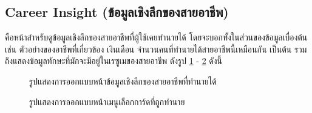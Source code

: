 \subsection{Career Insight (ข้อมูลเชิงลึกของสายอาชีพ)}
คือหน้าสำหรับดูข้อมูลเชิงลึกของสายอาชีพที่ผู้ใช้เคยทำนายได้ โดยจะบอกทั้งในส่วนของข้อมูลเบื่องต้น เช่น ตัวอย่างของอาชีพที่เกี่ยวข้อง เงินเดือน จำนวนคนที่ทำนายได้สายอาชีพนี้เหมือนกัน เป็นต้น รวมถึงแสดงข้อมูลทักษะที่มักจะมีอยู่ในเรซูเมของสายอาชีพ ดังรูป \ref{fig:CI.png} - \ref{fig:CI-dropdown.png} ดังนี้
\begin{figure}[H]\centering
    \caption{รูปแสดงการออกแบบหน้าข้อมูลเชิงลึกของสายอาชีพที่ทำนายได้}\label{fig:CI.png}
\end{figure}
\begin{figure}[H]\centering
    \caption{รูปแสดงการออกแบบหน้าเมนูเลือกการ์ดที่ถูกทำนาย}\label{fig:CI-dropdown.png}
\end{figure}

